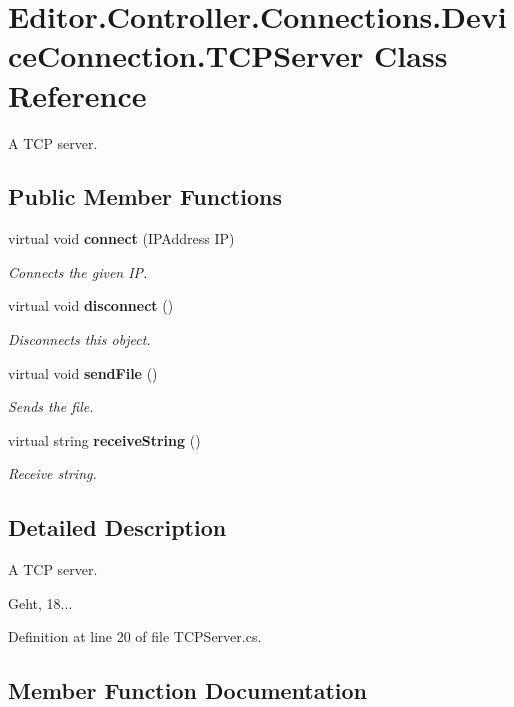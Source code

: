 \section{Editor.\-Controller.\-Connections.\-Device\-Connection.\-T\-C\-P\-Server Class Reference}
\label{class_editor_1_1_controller_1_1_connections_1_1_device_connection_1_1_t_c_p_server}


A T\-C\-P server.  


\subsection*{Public Member Functions}
\begin{DoxyCompactItemize}
\item 
virtual void {\bf connect} (I\-P\-Address I\-P)
\begin{DoxyCompactList}\small\item\em Connects the given I\-P. \end{DoxyCompactList}\item 
virtual void {\bf disconnect} ()
\begin{DoxyCompactList}\small\item\em Disconnects this object. \end{DoxyCompactList}\item 
virtual void {\bf send\-File} ()
\begin{DoxyCompactList}\small\item\em Sends the file. \end{DoxyCompactList}\item 
virtual string {\bf receive\-String} ()
\begin{DoxyCompactList}\small\item\em Receive string. \end{DoxyCompactList}\end{DoxyCompactItemize}


\subsection{Detailed Description}
A T\-C\-P server. 

Geht, 18... 

Definition at line 20 of file T\-C\-P\-Server.\-cs.



\subsection{Member Function Documentation}
